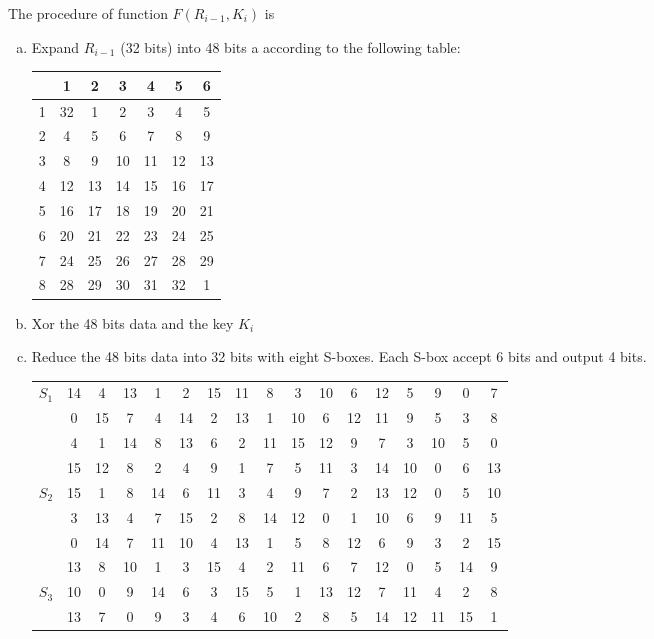 \documentclass{article}
\begin{document}
\begin{enumerate}
The procedure of function $F(R_{i-1},K_i)$ is
\begin{enumerate}[(a)]
\item
Expand $R_{i-1}$ (32 bits) into 48 bits a according to the following table:
\begin{center}
\begin{tabular}{c|cccccc}
& 1 & 2 & 3 & 4 & 5 & 6 \\
\hline
1 & 32 & 1 & 2 & 3 & 4 & 5 \\
2 & 4 & 5 & 6 & 7 & 8 & 9 \\
3 & 8 & 9 & 10 & 11 & 12 & 13 \\
4 & 12 & 13 & 14 & 15 & 16 & 17 \\
5 & 16 & 17 & 18 & 19 & 20 & 21 \\
6 & 20 & 21 & 22 & 23 & 24 & 25 \\
7 & 24 & 25 & 26 & 27 & 28 & 29 \\
8 & 28 & 29 & 30 & 31 & 32 & 1 \\
\end{tabular}
\end{center}
\item
Xor the 48 bits data and the key $K_i$
\item
Reduce the 48 bits data into 32 bits with eight S-boxes. Each S-box accept 6 bits and output 4 bits.
\begin{center}
\begin{tabular}{c|cccccccccccccccc}
\multirow{4}{*}{$S_1$} & 14 & 4 & 13 & 1 & 2 & 15 & 11 & 8 & 3 & 10 & 6 & 12 & 5 & 9 & 0 & 7 \\
& 0 & 15 & 7 & 4 & 14 & 2 & 13 & 1 & 10 & 6 & 12 & 11 & 9 & 5 & 3 & 8 \\  
& 4 & 1 & 14 & 8 & 13 & 6 & 2 & 11 & 15 & 12 & 9 & 7 & 3 & 10 & 5 & 0 \\  
& 15 & 12 & 8 & 2 & 4 & 9 & 1 & 7 & 5 & 11 & 3 & 14 & 10 & 0 & 6 & 13 \\\hline  
\multirow{4}{*}{$S_2$} & 15 & 1 & 8 & 14 & 6 & 11 & 3 & 4 & 9 & 7 & 2 & 13 & 12 & 0 & 5 & 10 \\  
& 3 & 13 & 4 & 7 & 15 & 2 & 8 & 14 & 12 & 0 & 1 & 10 & 6 & 9 & 11 & 5 \\  
& 0 & 14 & 7 & 11 & 10 & 4 & 13 & 1 & 5 & 8 & 12 & 6 & 9 & 3 & 2 & 15 \\  
& 13 & 8 & 10 & 1 & 3 & 15 & 4 & 2 & 11 & 6 & 7 & 12 & 0 & 5 & 14 & 9 \\\hline
\multirow{4}{*}{$S_3$} & 10 & 0 & 9 & 14 & 6 & 3 & 15 & 5 & 1 & 13 & 12 & 7 & 11 & 4 & 2 & 8 \\  
& 13 & 7 & 0 & 9 & 3 & 4 & 6 & 10 & 2 & 8 & 5 & 14 & 12 & 11 & 15 & 1 \\  

\end{tabular}
\end{center}
\end{enumerate}
\end{enumerate}
\end{document}
